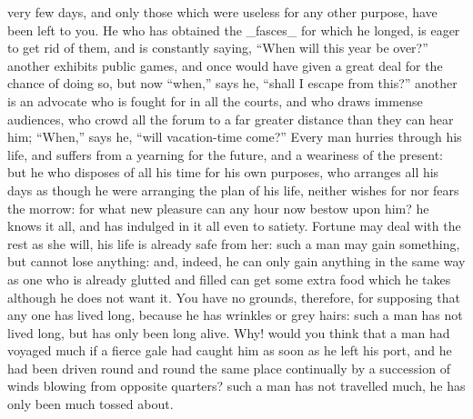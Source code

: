 \documentclass[12pt]{article}
\begin{document}
very few days, and only those which were useless for any other purpose, have been left to you. He who has obtained the \_fasces\_ for which he longed, is eager to get rid of them, and is constantly saying, “When will this year be over?” another exhibits public games, and once would have given a great deal for the chance of doing so, but now “when,” says he, “shall I escape from this?” another is an advocate who is fought for in all the courts, and who draws immense audiences, who crowd all the forum to a far greater distance than they can hear him; “When,” says he, “will vacation-time come?” Every man hurries through his life, and suffers from a yearning for the future, and a weariness of the present: but he who disposes of all his time for his own purposes, who arranges all his days as though he were arranging the plan of his life, neither wishes for nor fears the morrow: for what new pleasure can any hour now bestow upon him? he knows it all, and has indulged in it all even to satiety. Fortune may deal with the rest as she will, his life is already safe from her: such a man may gain something, but cannot lose anything: and, indeed, he can only gain anything in the same way as one who is already glutted and filled can get some extra food which he takes although he does not want it. You have no grounds, therefore, for supposing that any one has lived long, because he has wrinkles or grey hairs: such a man has not lived long, but has only been long alive. Why! would you think that a man had voyaged much if a fierce gale had caught him as soon as he left his port, and he had been driven round and round the same place continually by a succession of winds blowing from opposite quarters? such a man has not travelled much, he has only been much tossed about.
\end{document}

